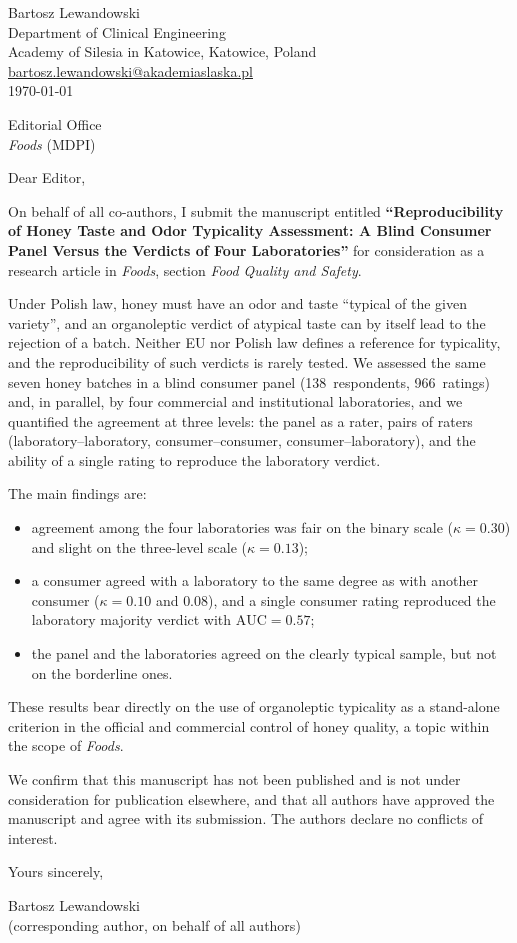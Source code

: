 \documentclass[11pt,a4paper]{article}
\begin{document}
\begin{flushright}
Bartosz Lewandowski\\
Department of Clinical Engineering\\
Academy of Silesia in Katowice, Katowice, Poland\\
\href{mailto:bartosz.lewandowski@akademiaslaska.pl}{bartosz.lewandowski@akademiaslaska.pl}\\[6pt]
\today
\end{flushright}

Editorial Office\\
\textit{Foods} (MDPI)

Dear Editor,

On behalf of all co-authors, I submit the manuscript entitled
\textbf{``Reproducibility of Honey Taste and Odor Typicality Assessment: A Blind
Consumer Panel Versus the Verdicts of Four Laboratories''} for consideration
as a research article in \textit{Foods}, section  \textit{Food Quality and Safety}.

Under Polish law, honey must have an odor and taste ``typical of the given
variety'', and an organoleptic verdict of atypical taste can by itself lead to
the rejection of a batch. Neither EU nor Polish law defines a reference for
typicality, and the reproducibility of such verdicts is rarely tested. We
assessed the same seven honey batches in a blind consumer panel
(138~respondents, 966~ratings) and, in parallel, by four commercial and
institutional laboratories, and we quantified the agreement at three levels:
the panel as a rater, pairs of raters (laboratory--laboratory,
consumer--consumer, consumer--laboratory), and the ability of a single rating
to reproduce the laboratory verdict.

The main findings are:
\begin{itemize}
\item agreement among the four laboratories was fair on the binary scale
($\kappa = 0.30$) and slight on the three-level scale ($\kappa = 0.13$);
\item a consumer agreed with a laboratory to the same degree as with another
consumer ($\kappa = 0.10$ and $0.08$), and a single consumer rating reproduced
the laboratory majority verdict with $\mathrm{AUC} = 0.57$;
\item the panel and the laboratories agreed on the clearly typical sample, but
not on the borderline ones.
\end{itemize}
These results bear directly on the use of organoleptic typicality as a
stand-alone criterion in the official and commercial control of honey quality,
a topic within the scope of \textit{Foods}.

We confirm that this manuscript has not been published and is not under consideration 
for publication elsewhere, and that all authors have approved the manuscript 
and agree with its submission. The authors declare no conflicts of interest.



Yours sincerely,

Bartosz Lewandowski\\
(corresponding author, on behalf of all authors)
\end{document}
